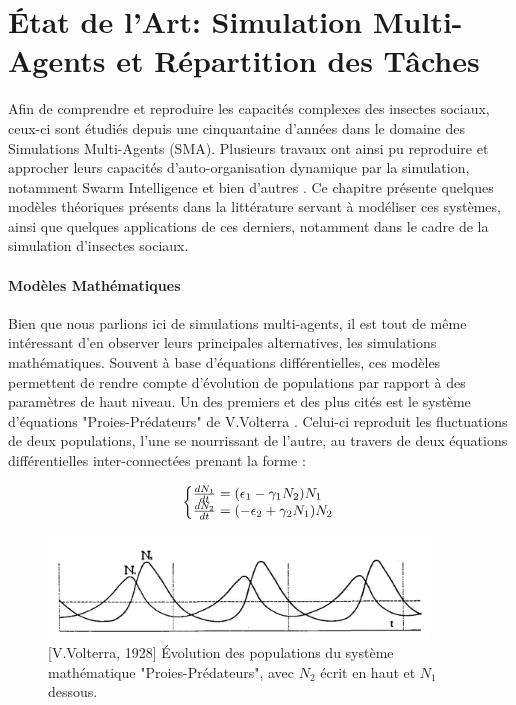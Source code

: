 \chapter{État de l'Art: Simulation Multi-Agents et Répartition des Tâches}

	Afin de comprendre et reproduire les capacités complexes des insectes sociaux, ceux-ci sont étudiés depuis une cinquantaine d'années dans le domaine des Simulations Multi-Agents (SMA). Plusieurs travaux ont ainsi pu reproduire et approcher leurs capacités d'auto-organisation dynamique par la simulation, notamment Swarm Intelligence \cite{bonabeau_natural_1999} et bien d'autres \cite{drogoul_simulation_1993, schmickl_taskselsim_2008, dornhaus_task_1998}. Ce chapitre présente quelques modèles théoriques présents dans la littérature servant à modéliser ces systèmes, ainsi que quelques applications de ces derniers, notamment dans le cadre de la simulation d'insectes sociaux.
	
    \subsubsection*{Modèles Mathématiques}
		Bien que nous parlions ici de simulations multi-agents, il est tout de même intéressant d'en observer leurs principales alternatives, les simulations mathématiques. Souvent à base d'équations différentielles, ces modèles permettent de rendre compte d'évolution de populations par rapport à des paramètres de haut niveau. Un des premiers et des plus cités est le système d'équations "Proies-Prédateurs" de V.Volterra \cite{volterra_variations_1928}. Celui-ci reproduit les fluctuations de deux populations, l'une se nourrissant de l'autre, au travers de deux équations différentielles inter-connectées prenant la forme :
		
		\begin{equation}
  			\left\{\begin{array}{@{}l@{}}
    			\frac{dN_1}{dt}=(\epsilon_1-\gamma_1 N_2) N_1\\
      			\frac{dN_2}{dt}=(- \epsilon_2 + \gamma_2 N_1) N_2
  			\end{array}\right.\,
		\end{equation}
		
		\begin{figure}
		\centering
		\includegraphics[width=0.9\textwidth]{./Pictures/Graphs/Volterra.JPG}
		\caption{[V.Volterra, 1928] \cite{volterra_variations_1928} Évolution des populations du système mathématique "Proies-Prédateurs", avec $N_2$ écrit en haut et $N_1$ dessous.}
		\label{volterra}
		\end{figure}
		
